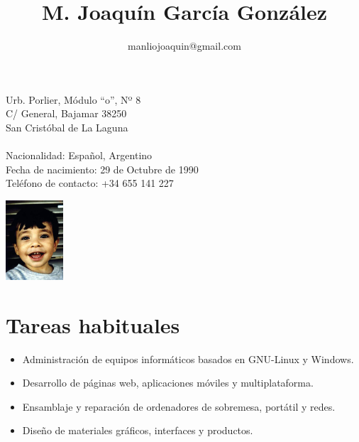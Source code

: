 \documentclass[10pt]{article}
\title{\bfseries M. Joaquín García González}
\author{manliojoaquin@gmail.com}
\date{}
\begin{document}

    \maketitle

    \begin{minipage}[ht]{0.48\textwidth}
        Urb. Porlier, Módulo ``o'', Nº 8\\
        C/ General, Bajamar 38250\\
        San Cristóbal de La Laguna\\
        \\
        Nacionalidad: Español, Argentino\\
        Fecha de nacimiento: 29 de Octubre de 1990\\
        Teléfono de contacto: +34 655 141 227
    \end{minipage}
    \begin{minipage}[ht]{0.48\textwidth}
        \begin{flushright}
        \includegraphics[height=8em]{profile}
        \end{flushright}
    \end{minipage}

    \section*{Tareas habituales}
    \begin{itemize}
        \item Administración de equipos informáticos basados en GNU-Linux y Windows.

        \item Desarrollo de páginas web, aplicaciones móviles y multiplataforma.

        \item Ensamblaje y reparación de ordenadores de sobremesa, portátil y redes.

        \item Diseño de materiales gráficos, interfaces y productos.
    \end{itemize}
\end{document}
